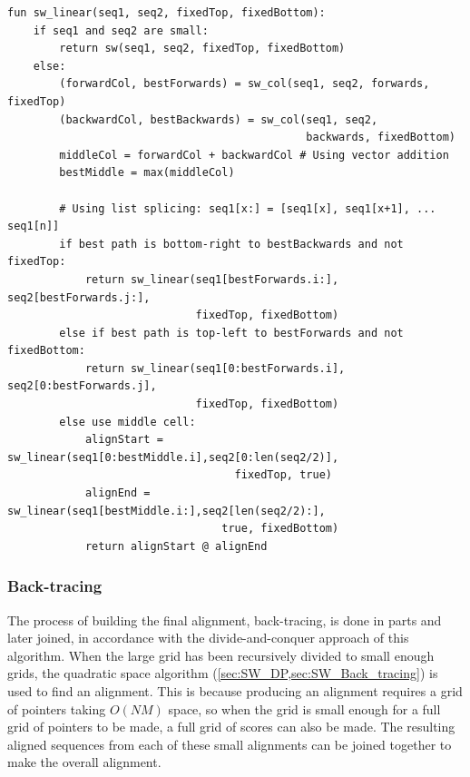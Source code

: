 \begin{minipage}{\linewidth}
\begin{lstlisting}[basicstyle=\linespread{0.9}\ttfamily\footnotesize, label={lst:pseudo_sw_linear},captionpos=b,caption={Pseudo-code representation of the linear space Smith-Waterman algorithm}]
fun sw_linear(seq1, seq2, fixedTop, fixedBottom):
    if seq1 and seq2 are small:
        return sw(seq1, seq2, fixedTop, fixedBottom)
    else:
        (forwardCol, bestForwards) = sw_col(seq1, seq2, forwards, fixedTop)
        (backwardCol, bestBackwards) = sw_col(seq1, seq2,
                                              backwards, fixedBottom)
        middleCol = forwardCol + backwardCol # Using vector addition
        bestMiddle = max(middleCol)

        # Using list splicing: seq1[x:] = [seq1[x], seq1[x+1], ... seq1[n]]
        if best path is bottom-right to bestBackwards and not fixedTop:
            return sw_linear(seq1[bestForwards.i:], seq2[bestForwards.j:],
                             fixedTop, fixedBottom)
        else if best path is top-left to bestForwards and not fixedBottom:
            return sw_linear(seq1[0:bestForwards.i], seq2[0:bestForwards.j],
                             fixedTop, fixedBottom)
        else use middle cell:
            alignStart = sw_linear(seq1[0:bestMiddle.i],seq2[0:len(seq2/2)],
                                   fixedTop, true)
            alignEnd = sw_linear(seq1[bestMiddle.i:],seq2[len(seq2/2):],
                                 true, fixedBottom)
            return alignStart @ alignEnd
\end{lstlisting}
\end{minipage}

\subsubsection{Back-tracing}
\label{sec:SW_Linear_Back_tracing}

The process of building the final alignment, back-tracing, is done in parts and later joined, in accordance with the divide-and-conquer approach of this algorithm.
When the large grid has been recursively divided to small enough grids, the quadratic space algorithm (\cref{sec:SW_DP,sec:SW_Back_tracing}) is used to find an alignment.
This is because producing an alignment requires a grid of pointers taking $O(NM)$ space, so when the grid is small enough for a full grid of pointers to be made, a full grid of scores can also be made.
The resulting aligned sequences from each of these small alignments can be joined together to make the overall alignment.


